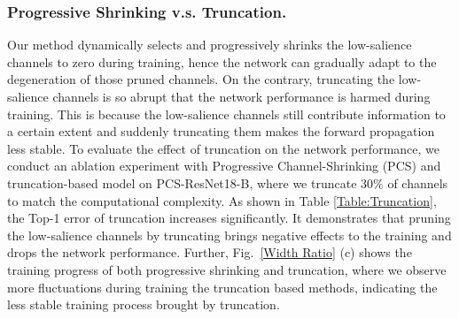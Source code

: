\documentclass[lettersize,journal]{IEEEtran}
\begin{document}
\subsubsection{Progressive Shrinking v.s. Truncation.}
\label{Table: Progressive Shrinking and Truncation}
Our method dynamically selects and progressively shrinks the low-salience channels to zero during training, hence the network can gradually adapt to the degeneration of those pruned channels. 
On the contrary, truncating the low-salience channels is so abrupt that the network performance is harmed during training. This is because the low-salience channels still contribute information to a certain extent and suddenly truncating them makes the forward propagation less stable. To evaluate the effect of truncation on the network performance, we conduct an ablation experiment with Progressive Channel-Shrinking (PCS) and truncation-based model on PCS-ResNet18-B, where we truncate $30\%$ of channels to match the computational complexity. As shown in Table \ref{Table:Truncation}, the Top-1 error of truncation increases significantly. It demonstrates that pruning the low-salience channels by truncating brings negative effects to the training and drops the network performance. Further, Fig.~\ref{Width Ratio} (c) shows the training progress of both progressive shrinking and truncation, where we observe more fluctuations during training the truncation based methods, indicating the less stable training process brought by truncation. 


\begin{table}[t]
\setlength{\tabcolsep}{0.8mm}
  \begin{center}
     \caption{Comparison of using Running Shrinking Policy and using input-dependent shrinking policy on PCS-ResNet18-B. Baseline denotes ResNet-18. $\uparrow$ and $\downarrow$ denote increasing and decreasing, respectively. 
     }
     \label{Table:static&dynamic}
  \end{center}
  \vspace{-5mm}
\end{table}
\end{document}
